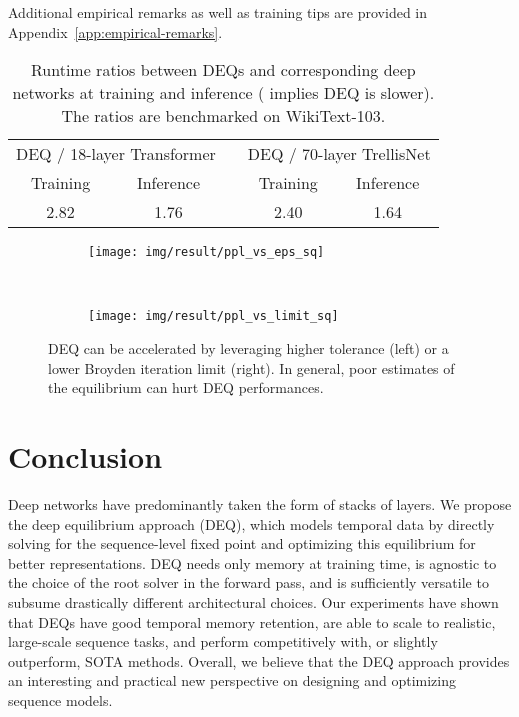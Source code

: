 \documentclass{article}
\begin{document}
Additional empirical remarks as well as training tips are provided in Appendix~\ref{app:empirical-remarks}.


\begin{table*}[t]
\caption{Runtime ratios between DEQs and corresponding deep networks at training and inference ( implies DEQ is slower). The ratios are benchmarked on WikiText-103.}
\label{tab:runtime}
\vspace{-1mm}
\centering
\def\arraystretch{1.06}
\begin{tabular}{ccccc}
\toprule
\multicolumn{2}{c}{DEQ / 18-layer Transformer} & & \multicolumn{2}{c}{DEQ / 70-layer TrellisNet} \\
\cline{1-2} \cline{4-5}
Training & Inference & & Training & Inference \\
\midrule
2.82 & 1.76 & & 2.40 & 1.64 \\
\bottomrule
\end{tabular}
\vspace{-1mm}
\end{table*}

\begin{figure}[t]
  \centering
  \begin{subfigure}[b]{0.455\textwidth}
    \texttt{[image: img/result/ppl\_vs\_eps\_sq]}
  \end{subfigure}
  ~
  \begin{subfigure}[b]{0.45\textwidth}
    \texttt{[image: img/result/ppl\_vs\_limit\_sq]}
  \end{subfigure}
  \vspace{-2mm}
  \caption{DEQ can be accelerated by leveraging higher tolerance  (left) or a lower Broyden iteration limit (right). In general, poor estimates of the equilibrium can hurt DEQ performances.}
  \label{fig:ppl-tradeoff}
  \vspace{-5mm}
\end{figure}


\section{Conclusion}

Deep networks have predominantly taken the form of stacks of layers. We propose the deep equilibrium approach (DEQ), which models temporal data by directly solving for the sequence-level fixed point and optimizing this equilibrium for better representations. DEQ needs only  memory at training time, is agnostic to the choice of the root solver in the forward pass, and is sufficiently versatile to subsume drastically different architectural choices. Our experiments have shown that DEQs have good temporal memory retention, are able to scale to realistic, large-scale sequence tasks, and perform competitively with, or slightly outperform, SOTA methods. Overall, we believe that the DEQ approach provides an interesting and practical new perspective on designing and optimizing sequence models.
\end{document}
